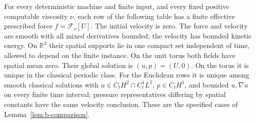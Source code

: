\begin{theorem}
For every deterministic machine and finite input, and every fixed positive computable viscosity $\nu$, each row of the following table has a finite effective prescribed force $f=\mathcal F_\nu[U]$.\label{thm:sb-realizations}  The initial velocity is zero.  The force and velocity are smooth with all mixed derivatives bounded; the velocity has bounded kinetic energy.  On $\mathbb R^3$ their spatial supports lie in one compact set independent of time, allowed to depend on the finite instance.  On the unit torus both fields have spatial mean zero.  Their global solution is $(u,p)=(U,0)$. On the torus it is unique in the classical periodic class. For the Euclidean rows it is unique among smooth classical solutions with $u\in C_tH^2\cap C_t^1L^2$, $p\in C_tH^1$, and bounded $u,\nabla u$ on every finite time interval; pressure representatives differing by spatial constants have the same velocity conclusion. These are the specified cases of Lemma~\ref{lem:b-comparison}.


\end{theorem}
